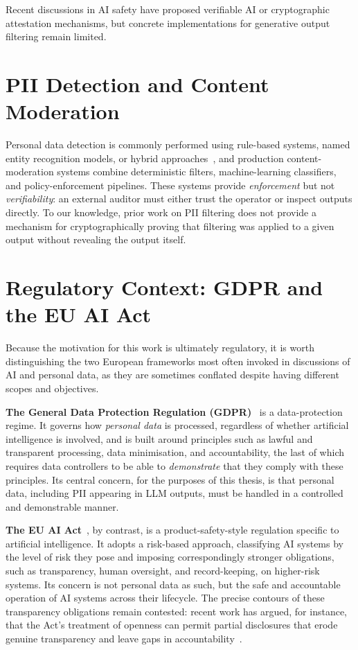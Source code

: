 \medskip

Recent discussions in AI safety have proposed verifiable AI or cryptographic attestation mechanisms, but concrete implementations for generative output filtering remain limited.

\section{PII Detection and Content Moderation}
\label{sec:rw-pii}

Personal data detection is commonly performed using rule-based systems, named entity recognition models, or hybrid approaches~\cite{dernoncourt2017deid}, and production content-moderation systems combine deterministic filters, machine-learning classifiers, and policy-enforcement pipelines. These systems provide \emph{enforcement} but not \emph{verifiability}: an external auditor must either trust the operator or inspect outputs directly. To our knowledge, prior work on PII filtering does not provide a mechanism for cryptographically proving that filtering was applied to a given output without revealing the output itself.

\section{Regulatory Context: GDPR and the EU AI Act}
\label{sec:rw-regulatory}

Because the motivation for this work is ultimately regulatory, it is worth distinguishing the two European frameworks most often invoked in discussions of AI and personal data, as they are sometimes conflated despite having different scopes and objectives.

\medskip

\textbf{The General Data Protection Regulation (GDPR)}~\cite{gdpr2016} is a data-protection regime. It governs how \emph{personal data} is processed, regardless of whether artificial intelligence is involved, and is built around principles such as lawful and transparent processing, data minimisation, and accountability, the last of which requires data controllers to be able to \emph{demonstrate} that they comply with these principles. Its central concern, for the purposes of this thesis, is that personal data, including PII appearing in LLM outputs, must be handled in a controlled and demonstrable manner.

\medskip

\textbf{The EU AI Act}~\cite{aiact2024}, by contrast, is a product-safety-style regulation specific to artificial intelligence. It adopts a risk-based approach, classifying AI systems by the level of risk they pose and imposing correspondingly stronger obligations, such as transparency, human oversight, and record-keeping, on higher-risk systems. Its concern is not personal data as such, but the safe and accountable operation of AI systems across their lifecycle. The precise contours of these transparency obligations remain contested: recent work has argued, for instance, that the Act's treatment of openness can permit partial disclosures that erode genuine transparency and leave gaps in accountability~\cite{ramos2026regulating}.

